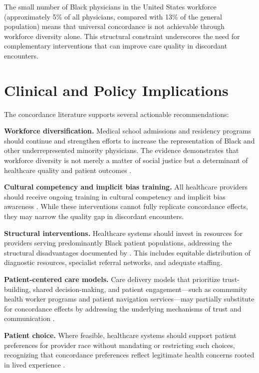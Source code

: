\documentclass[12pt]{article}
\begin{document}
The small number of Black physicians in the United States workforce (approximately 5\% of all physicians, compared with 13\% of the general population) means that universal concordance is not achievable through workforce diversity alone. This structural constraint underscores the need for complementary interventions that can improve care quality in discordant encounters.

\section{Clinical and Policy Implications}

The concordance literature supports several actionable recommendations:

\textbf{Workforce diversification.} Medical school admissions and residency programs should continue and strengthen efforts to increase the representation of Black and other underrepresented minority physicians. The evidence demonstrates that workforce diversity is not merely a matter of social justice but a determinant of healthcare quality and patient outcomes \citep{komaromy1996, greenwood2020}.

\textbf{Cultural competency and implicit bias training.} All healthcare providers should receive ongoing training in cultural competency \citep{betancourt2003} and implicit bias awareness \citep{hall2015}. While these interventions cannot fully replicate concordance effects, they may narrow the quality gap in discordant encounters.

\textbf{Structural interventions.} Healthcare systems should invest in resources for providers serving predominantly Black patient populations, addressing the structural disadvantages documented by \citet{bach2004}. This includes equitable distribution of diagnostic resources, specialist referral networks, and adequate staffing.

\textbf{Patient-centered care models.} Care delivery models that prioritize trust-building, shared decision-making, and patient engagement---such as community health worker programs and patient navigation services---may partially substitute for concordance effects by addressing the underlying mechanisms of trust and communication \citep{charles1997}.

\textbf{Patient choice.} Where feasible, healthcare systems should support patient preferences for provider race without mandating or restricting such choices, recognizing that concordance preferences reflect legitimate health concerns rooted in lived experience \citep{chen2005}.
\end{document}

